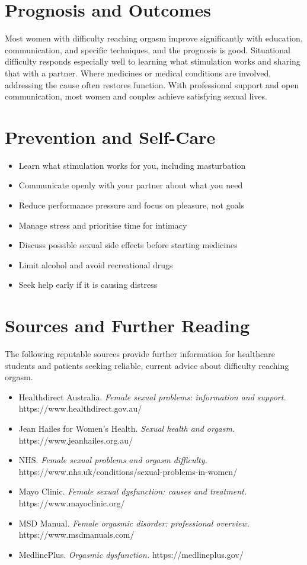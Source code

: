 \section*{Prognosis and Outcomes}
Most women with difficulty reaching orgasm improve significantly with education, communication, and specific techniques, and the prognosis is good. Situational difficulty responds especially well to learning what stimulation works and sharing that with a partner. Where medicines or medical conditions are involved, addressing the cause often restores function. With professional support and open communication, most women and couples achieve satisfying sexual lives.

\section*{Prevention and Self-Care}
\begin{itemize}
    \item Learn what stimulation works for you, including masturbation
    \item Communicate openly with your partner about what you need
    \item Reduce performance pressure and focus on pleasure, not goals
    \item Manage stress and prioritise time for intimacy
    \item Discuss possible sexual side effects before starting medicines
    \item Limit alcohol and avoid recreational drugs
    \item Seek help early if it is causing distress
\end{itemize}

\section*{Sources and Further Reading}
The following reputable sources provide further information for healthcare students and patients seeking reliable, current advice about difficulty reaching orgasm.

\begin{itemize}
    \item Healthdirect Australia. \textit{Female sexual problems: information and support.} https://www.healthdirect.gov.au/
    \item Jean Hailes for Women's Health. \textit{Sexual health and orgasm.} https://www.jeanhailes.org.au/
    \item NHS. \textit{Female sexual problems and orgasm difficulty.} https://www.nhs.uk/conditions/sexual-problems-in-women/
    \item Mayo Clinic. \textit{Female sexual dysfunction: causes and treatment.} https://www.mayoclinic.org/
    \item MSD Manual. \textit{Female orgasmic disorder: professional overview.} https://www.msdmanuals.com/
    \item MedlinePlus. \textit{Orgasmic dysfunction.} https://medlineplus.gov/
\end{itemize}
